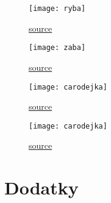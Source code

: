 \documentclass[12pt,a4paper]{report}                      %
\begin{document}


\begin{figure}[H]
  \centering
  \caption{\href{https://cz.pinterest.com/pin/750623462885443700/}{source}}
  \texttt{[image: ryba]}
\end{figure}




\begin{figure}[H]
  \centering
  \caption{\href{https://www.pinterest.com/pin/484418503638647556/}{source}}
  \texttt{[image: zaba]}
\end{figure}



\begin{figure}[H]
  \centering
  \caption{\href{https://petrakubaskova.cz/wp-content/uploads/2024/07/elixir-cze.png}{source}}
  \texttt{[image: carodejka]}
\end{figure}




\begin{figure}[H]
  \centering
  \caption{\href{https://petrakubaskova.cz/wp-content/uploads/2024/07/elixir-cze.png}{source}}
  \texttt{[image: carodejka]}
\end{figure}







\appendix

\chapter{Dodatky}
\label{chap:dodatky}
\end{document}
